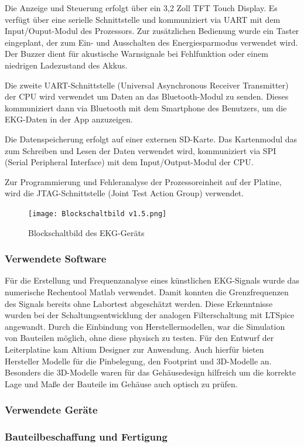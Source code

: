 Die Anzeige und Steuerung erfolgt über ein 3,2 Zoll TFT Touch Display. Es verfügt über eine serielle Schnittstelle und kommuniziert via UART mit dem Input/Ouput-Modul des Prozessors. Zur zusätzlichen Bedienung wurde ein Taster eingeplant, der zum Ein- und Ausschalten des Energiesparmodus verwendet wird. Der Buzzer dient für akustische Warnsignale bei Fehlfunktion oder einem niedrigen Ladezustand des Akkus.

Die zweite UART-Schnittstelle (Universal Asynchronous Receiver Transmitter) der CPU wird verwendet um Daten an das Bluetooth-Modul zu senden. Dieses kommuniziert dann via Bluetooth mit dem Smartphone des Benutzers, um die EKG-Daten in der App anzuzeigen.

Die Datenspeicherung erfolgt auf einer externen SD-Karte. Das Kartenmodul das zum Schreiben und Lesen der Daten verwendet wird, kommuniziert via SPI (Serial Peripheral Interface) mit dem Input/Output-Modul der CPU.

Zur Programmierung und Fehleranalyse der Prozessoreinheit auf der Platine, wird die JTAG-Schnittstelle (Joint Test Action Group) verwendet.


\begin{figure} [h]
	\texttt{[image: Blockschaltbild v1.5.png]}
	\caption{Blockschaltbild des EKG-Geräts}
	\label{fig_Blockschaltbild} 
\end{figure}


\subsubsection{Verwendete Software}

Für die Erstellung und Frequenzanalyse eines künstlichen EKG-Signals wurde das numerische Rechentool Matlab verwendet. Damit konnten die Grenzfrequenzen des Signals bereits ohne Labortest abgeschätzt werden. Diese Erkenntnisse wurden bei der Schaltungsentwicklung der analogen Filterschaltung mit LTSpice angewandt. Durch die Einbindung von Herstellermodellen, war die Simulation von Bauteilen möglich, ohne diese physisch zu testen. Für den Entwurf der Leiterplatine kam Altium Designer zur Anwendung. Auch hierfür bieten Hersteller Modelle für die Pinbelegung, den Footprint und 3D-Modelle an. Besonders die 3D-Modelle waren für das Gehäusedesign hilfreich um die korrekte Lage und Maße der Bauteile im Gehäuse auch optisch zu prüfen.

\subsubsection{Verwendete Geräte}

\subsubsection{Bauteilbeschaffung und Fertigung} 
